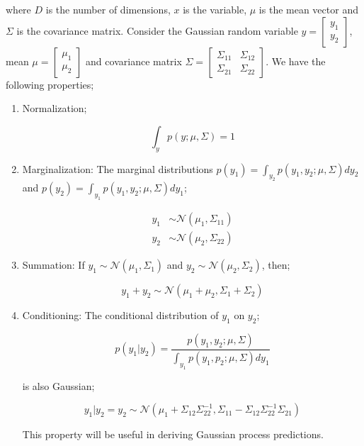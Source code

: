 \documentclass{article}
\begin{document}
where $D$ is the number of dimensions, $x$ is the variable, $\mu$ is the mean vector and $\Sigma$ is the covariance matrix. Consider the Gaussian random variable $y = \begin{bmatrix}
y_{1} \\
y_{2}
\end{bmatrix}$, mean $\mu = \begin{bmatrix}
\mu_{1} \\
\mu_{2}
\end{bmatrix}$ and covariance matrix $\Sigma = \begin{bmatrix}
\Sigma_{11} & \Sigma_{12} \\
\Sigma_{21} & \Sigma_{22}
\end{bmatrix}$. We have the following properties;

\begin{enumerate}
\item Normalization;

\begin{equation}
\int_{y} p(y; \mu, \Sigma) = 1
\end{equation}

\item Marginalization: The marginal distributions $p(y_{1}) = \int_{y_{2}} p(y_{1}, y_{2}; \mu, \Sigma) dy_{2}$ and $p(y_{2}) = \int_{y_{1}} p(y_{1}, y_{2}; \mu, \Sigma) dy_{1}$;

\begin{align}
y_{1} &\sim \mathcal{N}(\mu_{1}, \Sigma_{11}) \\
y_{2} &\sim \mathcal{N}(\mu_{2}, \Sigma_{22})
\end{align}

\item Summation: If $y_{1} \sim \mathcal{N}(\mu_{1}, \Sigma_{1})$ and $y_{2} \sim \mathcal{N}(\mu_{2}, \Sigma_{2})$, then;

\begin{equation}
y_{1} + y_{2} \sim \mathcal{N}(\mu_{1}+\mu_{2}, \Sigma_{1}+\Sigma_{2})
\end{equation}

\item Conditioning: The conditional distribution of $y_{1}$ on $y_{2}$;

\begin{equation}
p(y_{1}|y_{2}) = \frac{p(y_{1}, y_{2}; \mu, \Sigma)}{\int_{y_{1}} p(y_{1}, p_{2}; \mu, \Sigma) dy_{1}}
\end{equation}

is also Gaussian;

\begin{equation}
y_{1}|y_{2} = y_{2} \sim \mathcal{N}(\mu_{1} + \Sigma_{12}\Sigma_{22}^{-1}, \Sigma_{11} - \Sigma_{12}\Sigma_{22}^{-1}\Sigma_{21})
\end{equation}

This property will be useful in deriving Gaussian process predictions.

\end{enumerate}
\end{document}
